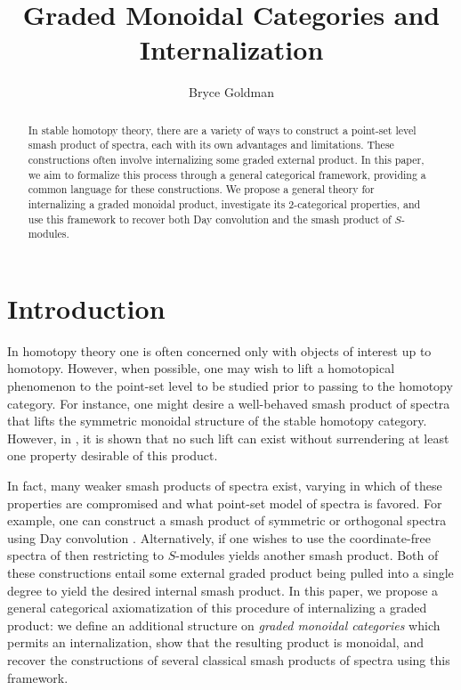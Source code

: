 \documentclass[openany, amssymb, psamsfonts]{amsart}
\title{Graded Monoidal Categories and Internalization}
\author{Bryce Goldman}
\theoremstyle{definition}
\numberwithin{equation}{section}
\begin{document}
\begin{abstract}
    In stable homotopy theory, there are a variety of ways to construct a point-set level smash product of spectra, each with its own advantages and limitations. These constructions often involve internalizing some graded external product. In this paper, we aim to formalize this process through a general categorical framework, providing a common language for these constructions. We propose a general theory for internalizing a graded monoidal product, investigate its 2-categorical properties, and use this framework to recover both Day convolution and the smash product of $S$-modules.
\end{abstract}

\maketitle

\tableofcontents

\section{Introduction}
\label{section:intro}

In homotopy theory one is often concerned only with objects of interest up to homotopy. However, when possible, one may wish to lift a homotopical phenomenon to the point-set level to be studied prior to passing to the homotopy category. For instance, one might desire a well-behaved smash product of spectra that lifts the symmetric monoidal structure of the stable homotopy category. However, in \cite{lewis}, it is shown that no such lift can exist without surrendering at least one property desirable of this product.

In fact, many weaker smash products of spectra exist, varying in which of these properties are compromised and what point-set model of spectra is favored. For example, one can construct a smash product of symmetric or orthogonal spectra using Day convolution \cite{MMSS, schwede, HSS}. Alternatively, if one wishes to use the coordinate-free spectra of \cite{EKMM} then restricting to $S$-modules yields another smash product. Both of these constructions entail some external graded product being pulled into a single degree to yield the desired internal smash product. In this paper, we propose a general categorical axiomatization of this procedure of internalizing a graded product: we define an additional structure on \emph{graded monoidal categories} which permits an internalization, show that the resulting product is monoidal, and recover the constructions of several classical smash products of spectra using this framework. 
\end{document}
